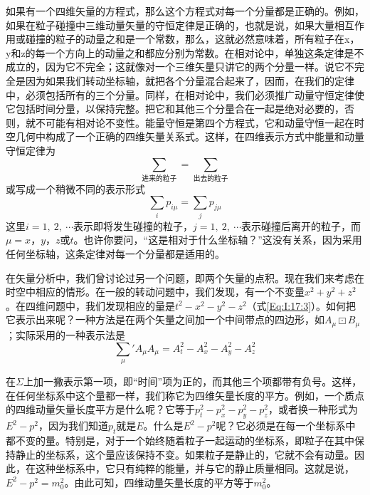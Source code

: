 如果有一个四维矢量的方程式，那么这个方程式对每一个分量都是正确的。例如，如果在粒子碰撞中三维动量矢量的守恒定律是正确的，也就是说，如果大量相互作用或碰撞的粒子的动量之和是一个常数，那么，这就必然意味着，所有粒子在x，y和z的每一个方向上的动量之和都应分别为常数。在相对论中，单独这条定律是不成立的，因为它不完全；这就像对一个三维矢量只讲它的两个分量一样。说它不完全是因为如果我们转动坐标轴，就把各个分量混合起来了，因而，在我们的定律中，必须包括所有的三个分量。同样，在相对论中，我们必须推广动量守恒定律使它包括时间分量，以保持完整。把它和其他三个分量合在一起是绝对必要的，否则，就不可能有相对论不变性。能量守恒是第四个方程式，它和动量守恒一起在时空几何中构成了一个正确的四维矢量关系式。这样，在四维表示方式中能量和动量守恒定律为
\begin{equation}
    \label{Eq:I:17:13}
    \mathop{\sum p_\mu}\limits_{\text{进来的粒子}} = \mathop{\sum p_\mu}\limits_{\text{出去的粒子}}
\end{equation}
或写成一个稍微不同的表示形式
\begin{equation}
    \label{Eq:I:17:14}
    \sum_i p_{i\mu} = \sum_j p_{j\mu}
\end{equation}
这里$i=1,~2,~\cdots$表示即将发生碰撞的粒子，$j=1,~2,~\cdots$表示碰撞后离开的粒子，而$\mu=x$，$y$，$z$或$t$。也许你要问，“这是相对于什么坐标轴？”这没有关系，因为采用任何坐标轴，这条定律对每一个分量都是适用的。

在矢量分析中，我们曾讨论过另一个问题，即两个矢量的点积。现在我们来考虑在时空中相应的情形。在一般的转动问题中，我们发现，有一个不变量$x^2+y^2+z^2$。在四维问题中，我们发现相应的量是$t^2-x^2-y^2-z^2$（式\ref{Eq:I:17:3}）。如何把它表示出来呢？一种方法是在两个矢量之间加一个中间带点的四边形，如$A_\mu \boxdot  B_\mu$；实际采用的一种表示法是
\begin{equation}
    \label{Eq:I:17:15}
    {\sum_{\mu}}' A_\mu A_\mu = A^2_t - A^2_x - A^2_y - A^2_z 
\end{equation}

在$\Sigma$上加一撇表示第一项，即“时间”项为正的，而其他三个项都带有负号。这样，在任何坐标系中这个量都一样，我们称它为四维矢量长度的平方。例如，一个质点的四维动量矢量长度平方是什么呢？它等于$p^2_t - p^2_x - p^2_y - p^2_z$，或者换一种形式为$E^2-p^2$，因为我们知道$p_t$就是$E$。什么是$E^2-p^2$呢？它必须是在每一个坐标系中都不变的量。特别是，对于一个始终随着粒子一起运动的坐标系，即粒子在其中保持静止的坐标系，这个量应该保持不变。如果粒子是静止的，它就不会有动量。因此，在这种坐标系中，它只有纯粹的能量，并与它的静止质量相同。这就是说，$E^2-p^2=m^2_0$。由此可知，四维动量矢量长度的平方等于$m^2_0$。

